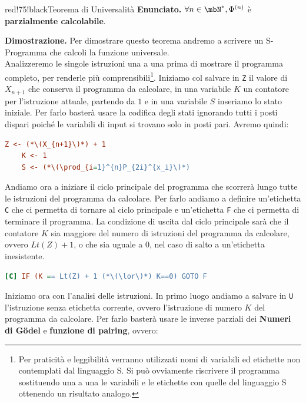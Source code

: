 \newpage
\begin{halfframedbox}{red!75!black}{Teorema di Universalità}\label{Teorema di Universalità}
  \textbf{Enunciato. } \(\forall n \in \mbN^*, \Phi^{(n)}\) è \textbf{parzialmente calcolabile}.

  \begin{center}
    \textcolor{red!75!black}{\hdashrule[0.5ex]{18cm}{1pt}{3mm 3pt 1mm 2pt}}
  \end{center}

  \textbf{Dimostrazione. } Per dimostrare questo teorema andremo a scrivere un S-Programma che calcoli la funzione universale.\\
  Analizzeremo le singole istruzioni una a una prima di mostrare il programma completo, per renderle più comprensibili\footnote{Per praticità e leggibilità verranno utilizzati nomi di variabili ed etichette non contemplati dal linguaggio S. Si può ovviamente riscrivere il programma sostituendo una a una le variabili e le etichette con quelle del linguaggio S ottenendo un risultato analogo.}.
  Iniziamo col salvare in \lstinline{Z} il valore di \(X_{n+1}\) che conserva il programma da calcolare, in una variabile \(K\) un contatore per l'istruzione attuale, partendo da \(1\) e in una variabile \(S\) inseriamo lo stato iniziale. Per farlo basterà usare la codifica degli stati ignorando tutti i posti dispari poiché le variabili di input si trovano solo in posti pari. Avremo quindi:
  \begin{lstlisting}[language=ini, caption={ }]
    Z <- (*\(X_{n+1}\)*) + 1
    K <- 1
    S <- (*\(\prod_{i=1}^{n}P_{2i}^{x_i}\)*)
  \end{lstlisting}
  Andiamo ora a iniziare il ciclo principale del programma che scorrerà lungo tutte le istruzioni del programma da calcolare. Per farlo andiamo a definire un'etichetta \lstinline{C} che ci permetta di tornare al ciclo principale e un'etichetta \lstinline{F} che ci permetta di terminare il programma. La condizione di uscita dal ciclo principale sarà che il contatore \(K\) sia maggiore del numero di istruzioni del programma da calcolare, ovvero \(Lt(Z)+1\), o che sia uguale a \(0\), nel caso di salto a un'etichetta inesistente.
  \begin{lstlisting}[language=ini, caption={ }]
    [C] IF (K == Lt(Z) + 1 (*\(\lor\)*) K==0) GOTO F
  \end{lstlisting}
  Iniziamo ora con l'analisi delle istruzioni. In primo luogo andiamo a salvare in \lstinline{U} l'istruzione senza etichetta corrente, ovvero l'istruzione di numero \(K\) del programma da calcolare. Per farlo basterà usare le inverse parziali dei \textbf{Numeri di Gödel} e \textbf{funzione di pairing}, ovvero:

\end{halfframedbox}
